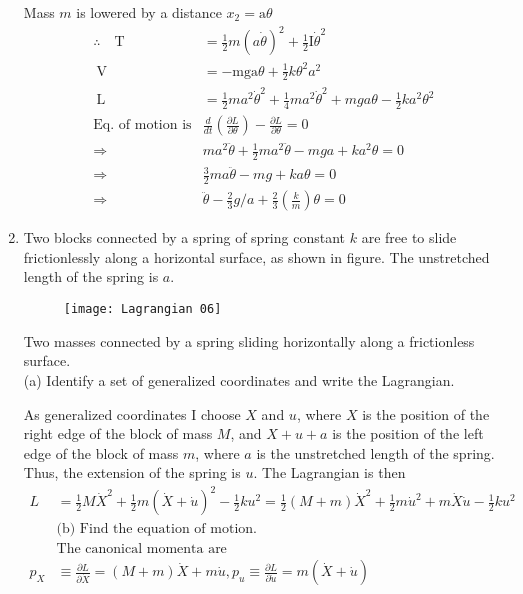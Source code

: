 \begin{enumerate}
\begin{answer}
	Mass $m$ is lowered by a distance $x_{2}=\mathrm{a} \theta$
	\begin{align*}
\therefore \quad \mathrm{T} &=\frac{1}{2} m(a \dot{\theta})^{2}+\frac{1}{2} \mathrm{I} \dot{\theta}^{2} \\ \mathrm{~V} &=-\mathrm{mga} \theta+\frac{1}{2} k \theta^{2} a^{2} \\ \mathrm{~L} &=\frac{1}{2} m a^{2} \dot{\theta}^{2}+\frac{1}{4} m a^{2} \dot{\theta}^{2}+m g a \theta-\frac{1}{2} k a^{2} \theta^{2} \\
\text{Eq. of motion is}&
\frac{d}{d t}\left(\frac{\partial L}{\partial \theta}\right)-\frac{\partial L}{\partial \theta}=0\\
\Rightarrow \quad &m a^{2} \ddot{\theta}+\frac{1}{2} m a^{2} \ddot{\theta}-m g a+k a^{2} \theta=0\\
\Rightarrow \quad &\frac{3}{2} m a \ddot{\theta}-m g+k a \theta=0\\
\Rightarrow \quad &\ddot{\theta}-\frac{2}{3} g / a+\frac{2}{3}\left(\frac{k}{m}\right) \theta=0
	\end{align*}
\end{answer}
\item Two blocks connected by a spring of spring constant $k$ are free to slide frictionlessly along a horizontal surface, as shown in figure. The unstretched length of the spring is $a$.
\begin{figure}[H]
	\centering
	\texttt{[image: Lagrangian 06]}
\end{figure}
Two masses connected by a spring sliding horizontally along a frictionless surface.\\
(a) Identify a set of generalized coordinates and write the Lagrangian.
\begin{answer}
	As generalized coordinates I choose $X$ and $u$, where $X$ is the position of the right edge of the block of mass $M$, and $X+u+a$ is the position of the left edge of the block of mass $m$, where $a$ is the unstretched length of the spring. Thus, the extension of the spring is $u$. The Lagrangian is then
	\begin{align*}
	L&=\frac{1}{2} M \dot{X}^{2}+\frac{1}{2} m(\dot{X}+\dot{u})^{2}-\frac{1}{2} k u^{2}=\frac{1}{2}(M+m) \dot{X}^{2}+\frac{1}{2} m \dot{u}^{2}+m \dot{X} \dot{u}-\frac{1}{2} k u^{2}\\
	&\text{(b) Find the equation of motion.}\\
	&\text{The canonical momenta are}\\
	p_{X} &\equiv \frac{\partial L}{\partial \dot{X}}=(M+m) \dot{X}+m \dot{u}, p_{u} \equiv \frac{\partial L}{\partial \dot{u}}=m(\dot{X}+\dot{u})\\

\end{align*}
\end{answer}
\end{enumerate}
